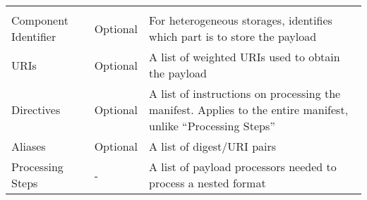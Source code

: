 \documentclass[0-thesis.tex]{subfiles}
\begin{document}
\begin{longtable}[]{@{}lll@{}}
\begin{minipage}[t]{0.60\columnwidth}
    \end{minipage}\tabularnewline
    \begin{minipage}[t]{0.23\columnwidth}\raggedright\strut
    Component Identifier\strut
    \end{minipage} & \begin{minipage}[t]{0.26\columnwidth}\raggedright\strut
    Optional\strut
    \end{minipage} & \begin{minipage}[t]{0.60\columnwidth}\raggedright\strut
    For heterogeneous storages, identifies which part is to store the
    payload\strut
    \end{minipage}\tabularnewline
    \begin{minipage}[t]{0.23\columnwidth}\raggedright\strut
    URIs\strut
    \end{minipage} & \begin{minipage}[t]{0.26\columnwidth}\raggedright\strut
    Optional\strut
    \end{minipage} & \begin{minipage}[t]{0.60\columnwidth}\raggedright\strut
    A list of weighted URIs used to obtain the payload\strut
    \end{minipage}\tabularnewline
    \begin{minipage}[t]{0.23\columnwidth}\raggedright\strut
    Directives\strut
    \end{minipage} & \begin{minipage}[t]{0.26\columnwidth}\raggedright\strut
    Optional\strut
    \end{minipage} & \begin{minipage}[t]{0.60\columnwidth}\raggedright\strut
    A list of instructions on processing the manifest. Applies to the entire
    manifest, unlike ``Processing Steps''\strut
    \end{minipage}\tabularnewline
    \begin{minipage}[t]{0.23\columnwidth}\raggedright\strut
    Aliases\strut
    \end{minipage} & \begin{minipage}[t]{0.26\columnwidth}\raggedright\strut
    Optional\strut
    \end{minipage} & \begin{minipage}[t]{0.60\columnwidth}\raggedright\strut
    A list of digest/URI pairs\strut
    \end{minipage}\tabularnewline
    \begin{minipage}[t]{0.23\columnwidth}\raggedright\strut
    Processing Steps\strut
    \end{minipage} & \begin{minipage}[t]{0.26\columnwidth}\raggedright\strut
    -\strut
    \end{minipage} & \begin{minipage}[t]{0.60\columnwidth}\raggedright\strut
    A list of payload processors needed to process a nested format\strut
    \end{minipage}\tabularnewline
    \bottomrule
\end{longtable}
\end{document}
